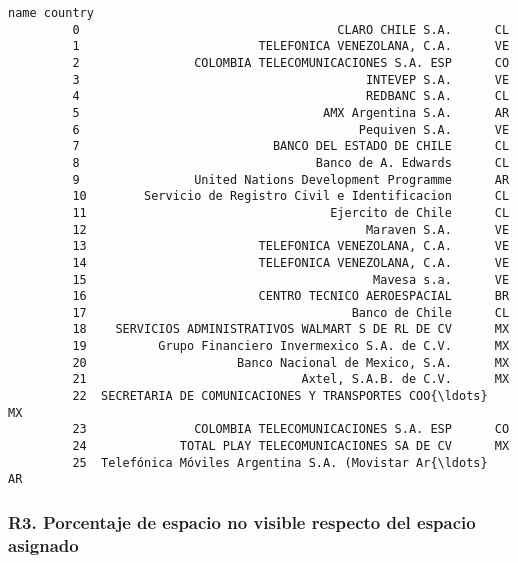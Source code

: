\documentclass[11pt]{article}
\begin{document}
\begin{Verbatim}[commandchars=\\\{\}]
                                                          name country  
         0                                    CLARO CHILE S.A.      CL  
         1                         TELEFONICA VENEZOLANA, C.A.      VE  
         2                COLOMBIA TELECOMUNICACIONES S.A. ESP      CO  
         3                                        INTEVEP S.A.      VE  
         4                                        REDBANC S.A.      CL  
         5                                  AMX Argentina S.A.      AR  
         6                                       Pequiven S.A.      VE  
         7                           BANCO DEL ESTADO DE CHILE      CL  
         8                                 Banco de A. Edwards      CL  
         9                United Nations Development Programme      AR  
         10        Servicio de Registro Civil e Identificacion      CL  
         11                                  Ejercito de Chile      CL  
         12                                       Maraven S.A.      VE  
         13                        TELEFONICA VENEZOLANA, C.A.      VE  
         14                        TELEFONICA VENEZOLANA, C.A.      VE  
         15                                        Mavesa s.a.      VE  
         16                        CENTRO TECNICO AEROESPACIAL      BR  
         17                                     Banco de Chile      CL  
         18    SERVICIOS ADMINISTRATIVOS WALMART S DE RL DE CV      MX  
         19          Grupo Financiero Invermexico S.A. de C.V.      MX  
         20                     Banco Nacional de Mexico, S.A.      MX  
         21                              Axtel, S.A.B. de C.V.      MX  
         22  SECRETARIA DE COMUNICACIONES Y TRANSPORTES COO{\ldots}      MX  
         23               COLOMBIA TELECOMUNICACIONES S.A. ESP      CO  
         24             TOTAL PLAY TELECOMUNICACIONES SA DE CV      MX  
         25  Telefónica Móviles Argentina S.A. (Movistar Ar{\ldots}      AR  
\end{Verbatim}
            
    \hypertarget{r3.-porcentaje-de-espacio-no-visible-respecto-del-espacio-asignado}{%
\subsubsection{R3. Porcentaje de espacio no visible respecto del espacio
asignado}\label{r3.-porcentaje-de-espacio-no-visible-respecto-del-espacio-asignado}}
\end{document}
